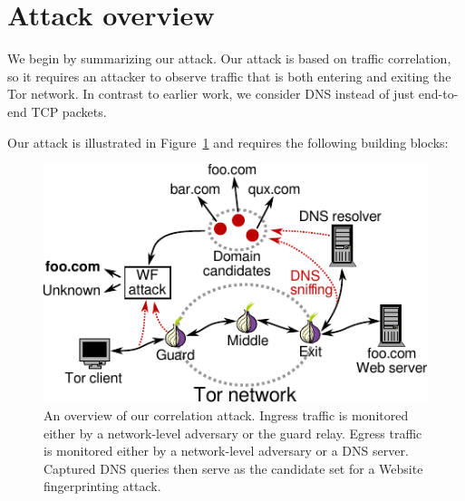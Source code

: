 \section{Attack overview}
\label{sec:attack}
We begin by summarizing our attack.  Our attack is based on traffic correlation,
so it requires an attacker to observe traffic that is both entering and exiting
the Tor network.  In contrast to earlier work, we consider DNS instead of just
end-to-end TCP packets.

Our attack is illustrated in Figure~\ref{fig:attack-scenario} and requires the
following building blocks:
\begin{figure}[t]
	\centering
	\includegraphics[width=\linewidth]{figures/attack-scenario.pdf}
	\caption{An overview of our correlation attack.  Ingress traffic is
	monitored either by a network-level adversary or the guard relay.  Egress
	traffic is monitored either by a network-level adversary or a DNS server.
	Captured DNS queries then serve as the candidate set for a Website
	fingerprinting attack.}
	\label{fig:attack-scenario}
\end{figure}

